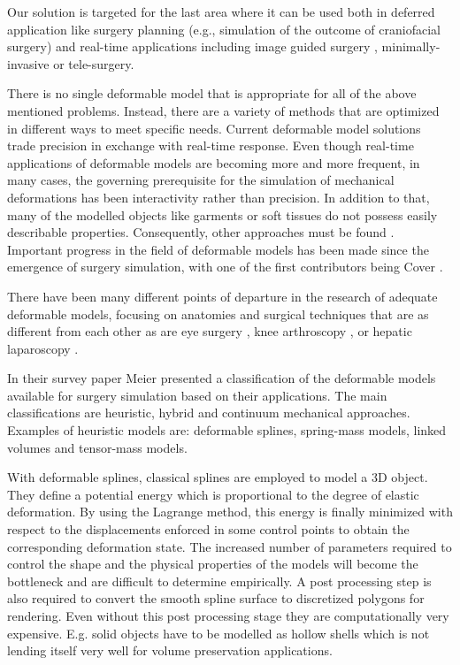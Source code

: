Our solution is targeted for the last area where it can be used both in deferred application like surgery 
planning (e.g., simulation of the outcome of craniofacial surgery) 
\cite{bro1995modelling, keeve1996craniofacial} and real-time applications including image guided 
surgery \cite{Szekely2000}, minimally-invasive or tele-surgery. 

There is no single deformable model that is appropriate for all of the above mentioned problems. Instead, 
there are a variety of methods that are optimized in different ways to meet specific needs. 
Current deformable model solutions trade precision in exchange with real-time response.
Even though real-time applications of deformable models are becoming more and more frequent, 
in many cases, the governing prerequisite for the simulation of mechanical deformations has been 
interactivity rather than precision. In addition to that, many of the modelled objects like garments or soft 
tissues do not possess easily describable properties. Consequently, other approaches must be found 
\cite{bro1998finite}. Important progress in the field of deformable models has been made since the 
emergence of surgery simulation, with one of the first contributors being Cover \etal \cite{cover1993interactively}. 

There have been many different points of departure in the research of adequate deformable models, 
focusing on anatomies and surgical techniques that are as different from each other as are eye surgery 
\cite{cai2001parametric, sagar1994virtual}, knee arthroscopy 
\cite{gibson1997simulating, hoffman1998commercially}, or hepatic laparoscopy \cite{cotin1999real}. 

In their survey paper Meier \etal \cite{Meier2005} presented a classification of the deformable models available for surgery 
simulation based on their applications. The main classifications are heuristic, hybrid and continuum mechanical approaches.
Examples of heuristic models are: deformable splines, spring-mass models, linked volumes and tensor-mass models. 

With deformable splines, classical splines are employed to model a 3D object. They define a potential energy which is proportional
to the degree of elastic deformation. By using the Lagrange method, this energy is finally minimized with respect to the displacements
enforced in some control points to obtain the corresponding deformation state. The increased number of parameters required to control
the shape and the physical properties of the models will become the bottleneck and are difficult to determine empirically. A post processing
step is also required to convert the smooth spline surface to discretized polygons for rendering. Even without this post processing stage
they are computationally very expensive. E.g. solid objects have to be modelled as hollow shells which is not lending itself very well for
volume preservation applications.

